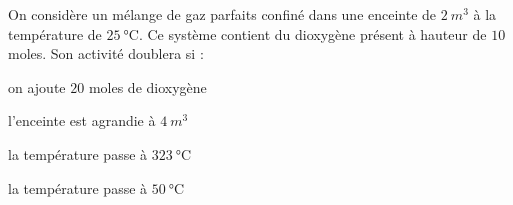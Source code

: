 

\finEntrainement






\hauteurLargeurCadreReponse		{8mm}{2cm}
\initialisationEntrainement


\debutEntrainement


\begin{enonce}

On considère un mélange de gaz parfaits confiné dans une enceinte de $\SI{2}{m^3}$ à la température de $\SI{25}{\celsius}$. Ce système contient %
du dioxygène présent à hauteur de $10$ moles. Son activité doublera si :
	
	\begin{listeQCM2Colonnes}
	\item on ajoute $20$ moles de dioxygène
	\item l'enceinte est agrandie à $\SI{4}{m^3}$
	\item la température passe à $\SI{323}{\celsius}$
	\item la température passe à $\SI{50}{\celsius}$
	\end{listeQCM2Colonnes}

\end{enonce}

